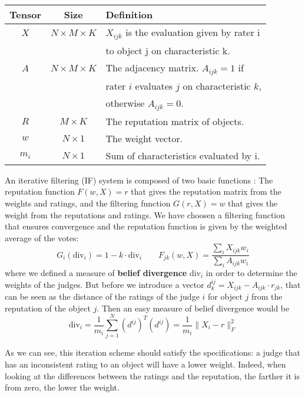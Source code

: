 \documentclass[9pt]{SelfArx} %
\begin{document}
\begin{table}[h]
\centering
\begin{tabular}{@{}ccl@{}}
\toprule
Tensor & Size                  & Definition                                                                                                     \\ \midrule
$X$    & $N \times M \times K$ & $X_{ijk}$ is the evaluation given by rater i\\
          &                                     &  to object j on characteristic k. \\
$A$    & $N \times M \times K$ & The adjacency matrix. $A_{ijk} = 1$ if \\
          &                                & rater $i$ evaluates $j$ on characteristic $k$, \\
          &                                & otherwise $A_{ijk} = 0$. \\
$R$    & $M \times K$          & The reputation matrix of objects. \\
$w$    & $N \times 1$          & The weight vector.     \\
$m_i$ & $N \times 1$          & Sum of characteristics evaluated by i. \\                                                                                      
\end{tabular}
\end{table}

An iterative filtering (IF) system is composed of two basic functions \cite{Cristo1}: The reputation function $F(w, X) = r$ that gives the reputation matrix from the weights and ratings, and the filtering function $G(r, X) = w$ that gives the weight from the reputations and ratings. We have choosen a filtering function that ensures convergence and the reputation function is given by the weighted average of the votes:
\[
    G_i(\mathrm{div}_i) = 1 - k \cdot \mathrm{div}_i
    \qquad
    F_{jk}(w, X) = \frac{\sum_i X_{ijk}w_i}{\sum_i A_{ijk} w_i}
\]
where we defined a measure of \textbf{belief divergence} $\mathrm{div}_i$ in order to determine the weights of the judges. But before we introduce a vector $d^{ij}_k = X_{ijk} - A_{ijk} \cdot r_{jk}$, that can be seen as the distance of the ratings of the judge $i$ for object $j$ from the reputation of the object $j$. Then an easy measure of belief divergence would be
\[
   \mathrm{div}_i = \frac{1}{m_i} \sum_{j=1}^{N} (d^{ij})^T(d^{ij}) = \frac{1}{m_i} \| X_i - r \|^2_F
\]

As we can see, this iteration scheme should satisfy the specifications: a judge that has an inconsistent rating to an object will have a lower weight. Indeed, when looking at the differences between the ratings and the reputation, the farther it is from zero, the lower the weight.\\
\end{document}
